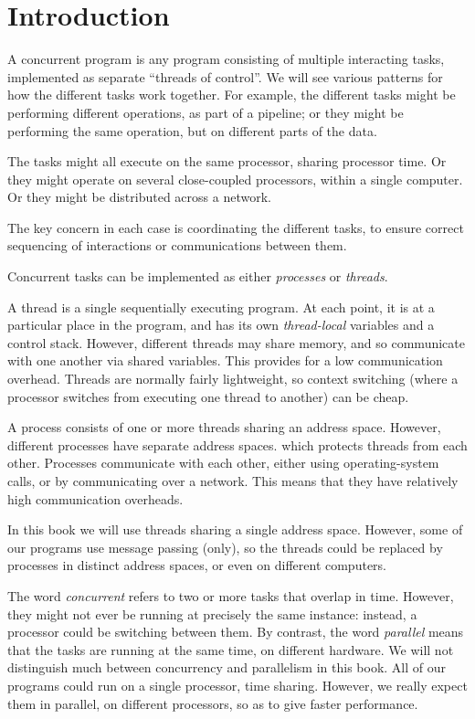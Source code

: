 \chapter{Introduction}

A concurrent program is any program consisting of multiple interacting tasks,
implemented as separate ``threads of control''.  We will see various patterns
for how the different tasks work together.  For example, the different tasks
might be performing different operations, as part of a pipeline; or they might
be performing the same operation, but on different parts of the data.

The tasks might all execute on the same processor, sharing processor time.  Or
they might operate on several close-coupled processors, within a single
computer.  Or they might be distributed across a network.

The key concern in each case is coordinating the different tasks, to ensure
correct sequencing of interactions or communications between them.


Concurrent tasks can be implemented as either \emph{processes} or
\emph{threads}.

A thread is a single sequentially executing program.  At each point, it is at
a particular place in the program, and has its own \emph{thread-local}
variables and a control stack.  However, different threads may share memory,
and so communicate with one another via shared variables.  This provides for a
low communication overhead.  Threads are normally fairly lightweight, so
context switching (where a processor switches from executing one thread to
another) can be cheap.

A process consists of one or more threads sharing an address space.  However,
different processes have separate address spaces. which protects threads from
each other.  Processes communicate with each other, either using
operating-system calls, or by communicating over a network.  This means that
they have relatively high communication overheads.

In this book we will use threads sharing a single address space.  However,
some of our programs use message passing (only), so the threads could be
replaced by processes in distinct address spaces, or even on different
computers.

The word \emph{concurrent} refers to two or more tasks that overlap in time.
However, they might not ever be running at precisely the same instance:
instead, a processor could be switching between them.  By contrast, the word
\emph{parallel} means that the tasks are running at the same time, on
different hardware.  We will not distinguish much between concurrency and
parallelism in this book.  All of our programs could run on a single
processor, time sharing.  However, we really expect them in parallel, on
different processors, so as to give faster performance. 

